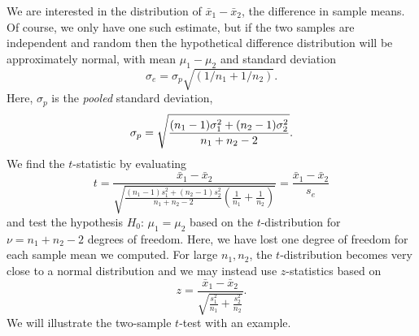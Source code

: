 	We are interested in the distribution of $\bar{x}_1 - \bar{x}_2$, the difference in sample means.
Of course, we only have one such estimate, but if the two
samples are independent and random then the hypothetical difference distribution will be approximately normal,
with mean  $\mu_1 - \mu_2$  and standard deviation
\begin{equation}
\sigma_e = \sigma_p \sqrt{ (1/n_1 + 1/n_2)}.
\end{equation}
Here, $\sigma_p$ is the \emph{pooled} standard deviation,
\begin{equation}
	\index{Pooled standard deviation}
	\index{Standard deviation!pooled}
\sigma_p = \sqrt{ \frac{(n_1 - 1 ) \sigma^2_1 + (n_2 - 1) \sigma^2_2}{n_1 + n_2 - 2}     }.	 
\end{equation}
We find the $t$-statistic by evaluating
\begin{equation}
t = \frac {\bar{x}_1 - \bar{x}_2} { \sqrt{ \frac{ (n_1 - 1) s^2_1 + (n_2 - 1) s^2_2 }
{n_1 + n_2 -2} \left( \frac{1}{n_1} + \frac{1}{n_2} \right)  }  } = \frac{\bar{x}_1 - \bar{x}_2}{s_e}
\label{eq:t_two_means}
\end{equation}
and test the hypothesis $H_0$: $\mu_1 = \mu_2$  based on the $t$-distribution for  $\nu = n_1 + n_2 - 2$ degrees of 
freedom.  Here, we have lost one degree of freedom for each sample mean we computed.
For large $n_1, n_2$, the $t$-distribution becomes very close to a normal distribution and we 
may instead use $z$-statistics based on
\begin{equation}
z = \frac{\bar{x}_1 - \bar{x}_2} { \sqrt{ \frac{s^2_1} {n_1} + \frac{s^2_2}{n_2} }}.
\label{eq:twosamplez}
\end{equation}
We will illustrate the two-sample $t$-test with an example.
